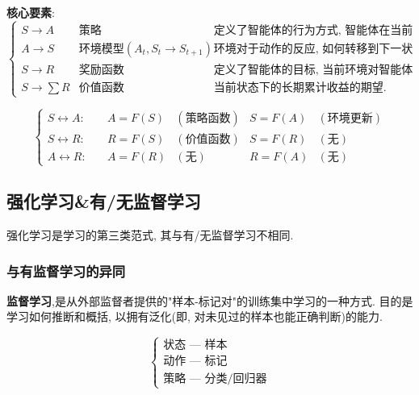 \documentclass{article}
\begin{document}
        \textbf{核心要素}:
        \begin{displaymath} \left\{ \begin{array}{llll}
            S \to A & \text{策略} & \text{定义了智能体的行为方式, 智能体在当前状态如何动作}\\
            A \to S & \text{环境模型}(A_t,S_t\to S_{t+1}) & \text{环境对于动作的反应, 如何转移到下一状态.(可选)}\\
            S \to R & \text{奖励函数} & \text{定义了智能体的目标, 当前环境对智能体反馈的奖励.}\\
            S \to \sum R & \text{价值函数} & \text{当前状态下的长期累计收益的期望.}
        \end{array} \right. \end{displaymath}

        \begin{displaymath} \left\{ \begin{array}{lllll}
            S \leftrightarrow A: \quad & A = F(S) & (\text{策略函数})    & S = F(A) & (\text{环境更新})\\
            S \leftrightarrow R: \quad & R = F(S) & (\text{价值函数})    & S = F(R) & (\text{无})\\
            A \leftrightarrow R: \quad & A = F(R) & (\text{无})    & R = F(A) & (\text{无})
        \end{array} \right. \end{displaymath}
        
    \subsection{强化学习\&有/无监督学习}
        强化学习是学习的第三类范式, 其与有/无监督学习不相同.
    
        \subsubsection{与有监督学习的异同}
            \textbf{监督学习},是从外部监督者提供的"样本-标记对"的训练集中学习的一种方式. 目的是学习如何推断和概括, 以拥有泛化(即, 对未见过的样本也能正确判断)的能力.
        
            \begin{displaymath} \left\{ \begin{array}{l}
                \text{状态 --- 样本}\\
                \text{动作 --- 标记}\\
                \text{策略 --- 分类/回归器}
            \end{array} \right. \end{displaymath}
            
\end{document}
